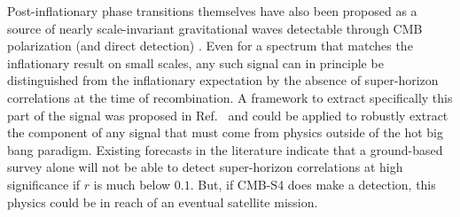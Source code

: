 Post-inflationary phase transitions themselves have also been proposed as a source of nearly scale-invariant gravitational waves detectable through CMB polarization (and direct detection) \cite{Krauss:1991qu,JonesSmith:2007ne,Giblin:2011yh,Figueroa:2012kw,Fenu:2013tea}. Even for a spectrum that matches the inflationary result on small scales, any such signal can in principle be distinguished from the inflationary expectation by the absence of super-horizon correlations at the time of recombination. A framework to extract specifically this part of the signal was proposed in Ref.~\cite{Baumann:2009mq} and could be applied to robustly extract the component of any signal that must come from physics outside of the hot big bang paradigm. Existing forecasts in the literature \cite{Lee:2014cya} indicate that a ground-based survey alone will not be able to detect super-horizon correlations at high significance if $r$ is much below $0.1$. But, if CMB-S4 does make a detection, this physics could be in reach of an eventual satellite mission.




%

